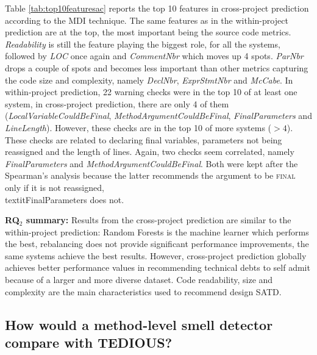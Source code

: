 Table \ref{tab:top10featuresac} reports the top 10 features in cross-project prediction according to the MDI technique. The same features as in the within-project prediction are at the top, the most important being the source code metrics. \textit{Readability} is still the feature playing the biggest role, for all the systems, followed by \textit{LOC} once again and \textit{CommentNbr} which moves up 4 spots. \textit{ParNbr} drops a couple of spots and becomes less important than other metrics capturing the code size and complexity, namely \textit{DeclNbr}, \textit{ExprStmtNbr} and \textit{McCabe}. In within-project prediction, 22 warning checks were in the top 10 of at least one system, in cross-project prediction, there are only 4 of them (\textit{LocalVariableCouldBeFinal}, \textit{MethodArgumentCouldBeFinal}, \textit{FinalParameters} and \textit{LineLength}). However, these checks are in the top 10 of more systems ($>4$). These checks are related to declaring final variables, parameters not being reassigned and the length of lines. Again, two checks seem correlated, namely \textit{FinalParameters} and \textit{MethodArgumentCouldBeFinal}. Both were kept after the Spearman's analysis because the latter recommends the argument to be \textsc{final} only if it is not reassigned, \\textit{FinalParameters} does not.

\begin{mdframed}
	{\bf RQ$_2$ summary:} Results from the cross-project prediction are similar to the within-project prediction: Random Forests is the machine learner which performs the best, rebalancing does not provide significant performance improvements, the same systems achieve the best results. However, cross-project prediction globally achieves better performance values in recommending technical debts to self admit because of a larger and more diverse dataset. Code readability, size and complexity are the main characteristics used to recommend design SATD.
\end{mdframed}

\subsection{How would a method-level smell detector compare with TEDIOUS?}


